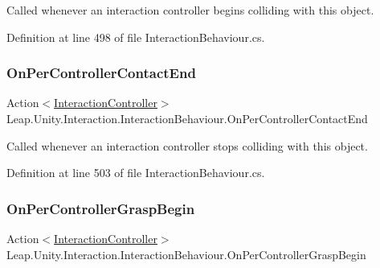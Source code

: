 Called whenever an interaction controller begins colliding with this object. 



Definition at line 498 of file Interaction\+Behaviour.\+cs.

\mbox{\label{class_leap_1_1_unity_1_1_interaction_1_1_interaction_behaviour_af7f796779bae4595c69e4379bf7158ec}} 
\subsubsection{\texorpdfstring{OnPerControllerContactEnd}{OnPerControllerContactEnd}}
{\footnotesize\ttfamily Action$<$\mbox{\hyperlink{class_leap_1_1_unity_1_1_interaction_1_1_interaction_controller}{Interaction\+Controller}}$>$ Leap.\+Unity.\+Interaction.\+Interaction\+Behaviour.\+On\+Per\+Controller\+Contact\+End}



Called whenever an interaction controller stops colliding with this object. 



Definition at line 503 of file Interaction\+Behaviour.\+cs.

\mbox{\label{class_leap_1_1_unity_1_1_interaction_1_1_interaction_behaviour_afb19f00ee7c35e145c70875cca188c8c}} 
\subsubsection{\texorpdfstring{OnPerControllerGraspBegin}{OnPerControllerGraspBegin}}
{\footnotesize\ttfamily Action$<$\mbox{\hyperlink{class_leap_1_1_unity_1_1_interaction_1_1_interaction_controller}{Interaction\+Controller}}$>$ Leap.\+Unity.\+Interaction.\+Interaction\+Behaviour.\+On\+Per\+Controller\+Grasp\+Begin}



